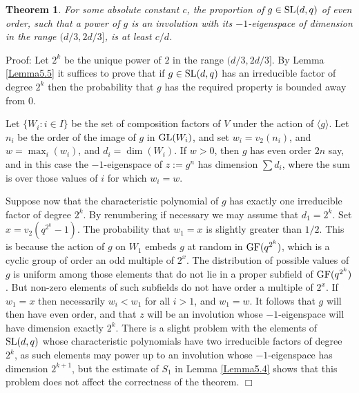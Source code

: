 \documentclass[12pt]{article}
\newtheorem{theorem}[definition]{Theorem}
\newenvironment{proof}{\normalsize {\sc Proof}:}{{\hfill $\Box$ \\}}
\def\SL{{\rm SL}}
\def\GL{{\rm GL}}
\def\GF{{\rm GF}}
\begin{document}
\begin{theorem}\label{Theorem5.1}  
For some absolute constant $c$, the proportion
of $g \in \SL(d,q)$ of even order, such that a power of $g$
is an involution with its $-1$-eigenspace of dimension in the range
$(d/3,2d/3]$, is at least $c/d$.
\end{theorem}
\begin{proof} 
Let $2^k$ be the unique power of $2$ in the range
$(d/3,2d/3]$. By Lemma \ref{Lemma5.5} it suffices to prove that 
if $g\in\SL(d,q)$
has an  irreducible factor of degree $2^k$ then the probability that
$g$ has the required property is bounded away from 0.

Let $\{W_i:i\in I\}$ be the set of composition factors of $V$
under the action of $\langle g\rangle$. Let $n_i$ be the order of the
image of $g$ in $\GL(W_i)$, and set $w_i=v_2(n_i)$, and
$w=\max_i(w_i)$, and $d_i=\dim(W_i)$. 
If $w>0$, then $g$ has even order $2n$  say,
and in  this case the $-1$-eigenspace of $z :=  g^n$ has
dimension $\sum d_i$, where the sum is over those values of $i$ for
which $w_i=w$. 

Suppose now that the characteristic polynomial of $g$
has exactly one irreducible factor of degree $2^k$. By renumbering if
necessary we may assume that $d_1=2^k$. Set $x=v_2(q^{2^k}-1)$.  The
probability that $w_1=x$ is slightly greater than $1/2$. This is
because the action of $g$ on $W_1$ embeds $g$ at random in
$\GF(q^{2^k})$, which is a cyclic group of order an odd multiple of
$2^x$. The distribution of possible values of $g$ is uniform among
those elements that do not lie in a proper subfield of $\GF(q^{2^k})$.
But non-zero elements of such subfields do not have order a multiple
of $2^x$. If $w_1=x$ then necessarily $w_i<w_1$ for all $i>1$,
and $w_1=w$. It follows that $g$ will then have even order, and that
$z$ will be an involution whose $-1$-eigenspace will have
dimension exactly $2^k$. 
There is a slight problem with the elements of $\SL(d,q)$
whose characteristic polynomials have two irreducible factors of
degree $2^k$, as such elements may power up to an involution
whose  $-1$-eigenspace has dimension $2^{k+1}$, but the estimate of $S_1$
in Lemma \ref{Lemma5.4} shows that this problem does 
not affect the correctness of the theorem.
\end{proof}
\end{document}
